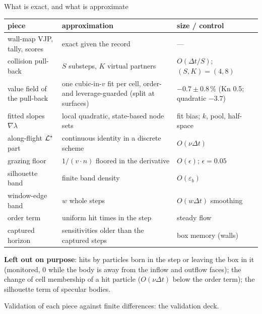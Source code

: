 \begin{frame}{What is exact, and what is approximate}
\small
\begin{tabular}{@{}p{4.0cm}p{5.2cm}p{3.9cm}@{}}
\toprule
piece & approximation & size / control\\
\midrule
wall-map VJP, tally, scores & exact given the record & ---\\
collision pull-back & $S$ substeps, $K$ virtual partners & $O(\Delta t/S)$; $(S,K)=(4,8)$\\
value field of the pull-back & one cubic-in-$v$ fit per cell, order- and leverage-guarded (split at surfaces) & $-0.7\pm0.8\,\%$ (Kn 0.5; quadratic $-3.7$)\\
fitted slopes $\nabla\lambda$ & local quadratic, state-based node sets & fit bias; $k$, pool, half-space\\
along-flight $\mathcal L^*$ part & continuous identity in a discrete scheme & $O(\nu\Delta t)$\\
grazing floor & $1/(v\cdot n)$ floored in the derivative & $O(\epsilon)$; $\epsilon = 0.05$\\
silhouette band & finite band density & $O(\varepsilon_b)$\\
window-edge band & $w$ whole steps & $O(w\Delta t)$ smoothing\\
order term & uniform hit times in the step & steady flow\\
captured horizon & sensitivities older than the captured steps & box memory (walls)\\
\bottomrule
\end{tabular}

\medskip
\textbf{Left out on purpose}: hits by particles born in the step or leaving the box in it
(monitored, $0$ while the body is away from the inflow and outflow faces); the change of cell
membership of a hit particle ($O(\nu\Delta t)$ below the order term); the silhouette term of
specular bodies.

\medskip
Validation of each piece against finite differences: the validation deck.
\end{frame}
